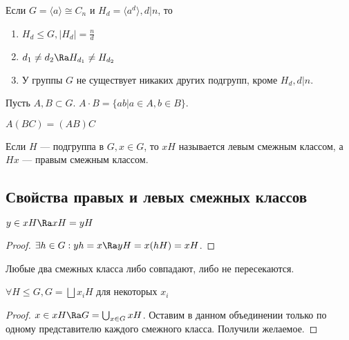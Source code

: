 \begin{theorem}
    Если \(G = \langle a \rangle \cong C_n\) и \(H_d = \langle a^d \rangle, d | n\), то
    \begin{enumerate}
        \item \(H_d \le G, |H_d| = \frac{n}{d}\)
        \item \(d_1 \ne d_2 \Ra H_{d_1} \ne H_{d_2}\)
        \item У группы \(G\) не существует никаких других подгрупп, кроме \(H_d, d | n\).
    \end{enumerate}
\end{theorem}

\begin{definition}
    Пусть \(A, B \subset G\). \(A \cdot B = \{ab | a \in A, b \in B\}\).
\end{definition}

\begin{note}
    \(A(BC) = (AB)C\)
\end{note}

\begin{definition}
    Если \(H\) --- подгруппа в \(G, x \in G\), то \(xH\) называется левым смежным классом, а \(Hx\) --- правым смежным классом.
\end{definition}

\subsection{Свойства правых и левых смежных классов}
\begin{proposition}
    \(y \in xH \Ra xH = yH\)
\end{proposition}
\begin{proof}
    \(\exists h \in G: yh = x \Ra yH = x(hH) = xH\).
\end{proof}

\begin{corollary}
    Любые два смежных класса либо совпадают, либо не пересекаются.
\end{corollary}

\begin{corollary}
    \(\forall H \le G, G = \bigsqcup x_i H\) для некоторых \(x_i\)
\end{corollary}
\begin{proof}
    \(x \in xH \Ra G = \bigcup_{x \in G} xH\). Оставим в данном объединении только по одному представителю каждого смежного класса. Получили желаемое.
\end{proof}

